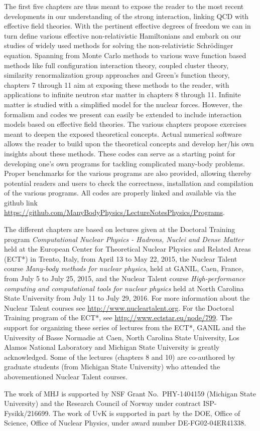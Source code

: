 The first five chapters are thus meant to
expose the reader to the most recent developments in our understanding
of the strong interaction, linking QCD with effective field
theories. With the pertinent effective degrees of freedom we can in
turn define various effective non-relativistic Hamiltonians and embark
on our studies of widely used methods for solving the non-relativistic
Schr\"odinger equation. Spanning from Monte Carlo methods to various
wave function based methods like full configuration interaction
theory, coupled cluster theory, similarity renormalization group
approaches and Green's function theory, chapters 7 through 11 aim at
exposing these methods to the reader, with applications to infinite neutron star
matter in chapters 8 through 11. Infinite matter is studied with a simplified model for the nuclear
forces. However, the formalism and codes we present can easily be
extended to include interaction models based on effective field
theories.  
The various chapters propose exercises meant to deepen the exposed theoretical concepts.
Actual numerical software allows the reader to build
upon the theoretical concepts and develop her/his own insights about
these methods. These codes can serve as a starting point for
developing one's own programs for tackling complicated many-body
problems.
Proper benchmarks for the various programs are also
provided, allowing thereby potential readers and users to check the
correctness, installation and compilation of the various programs. All
codes are properly linked and available via
the github link \url{https://github.com/ManyBodyPhysics/LectureNotesPhysics/Programs}.


\begin{acknowledgement}
The different chapters are based on lectures given at the Doctoral Training program {\em Computational Nuclear Physics - Hadrons, Nuclei and Dense Matter} held at  the European Center for Theoretical Nuclear Physics
and Related Areas (ECT*) in Trento, Italy, from April 13 to May 22, 2015, the Nuclear Talent course {\em Many-body methods for nuclear physics}, held at GANIL, Caen, France, from July 5 to July 25,  2015, and the Nuclear Talent course {\em High-performance computing and computational tools for nuclear physics} held at North Carolina State University from July 11 to July 29, 2016. For more information about the Nuclear Talent courses see \url{http://www.nucleartalent.org}. For the Doctoral Training program of the ECT*, see \url{http://www.ectstar.eu/node/799}.
The support for organizing these series of lectures from the ECT*, GANIL and the University of Basse Normadie at Caen, North Carolina State University, Los Alamos National Laboratory and Michigan State University is greatly acknowledged.   Some of the lectures (chapters 8 and 10) are co-authored by graduate students (from Michigan State University) who  attended the abovementioned Nuclear Talent courses.


The work of MHJ is supported by NSF Grant No.~PHY-1404159 (Michigan State University) and the Research Council of Norway
under contract ISP-Fysikk/216699. 
The work of UvK is supported in part by the DOE, Office of Science, Office of Nuclear Physics, under award number DE-FG02-04ER41338. 
\end{acknowledgement}

